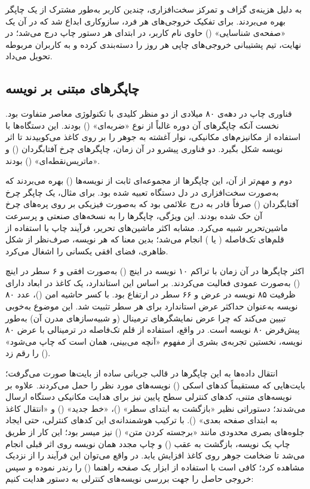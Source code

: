 به دلیل هزینه‌ی گزاف و تمرکز سخت‌افزاری، چندین کاربر به‌طور مشترک از یک چاپگر بهره می‌بردند. برای تفکیک خروجی‌های هر فرد، سازوکاری ابداع شد که در آن یک «صفحه‌ی شناسایی» () حاوی نام کاربر، در ابتدای هر دستور چاپ درج می‌شد؛ در نهایت، تیم پشتیبانی خروجی‌های چاپی هر روز را دسته‌بندی کرده و به کاربران مربوطه تحویل می‌داد.

\subsection{چاپگرهای مبتنی بر نویسه}

فناوری چاپ در دهه‌ی ۸۰ میلادی از دو منظر کلیدی با تکنولوژی معاصر متفاوت بود. نخست آنکه چاپگرهای آن دوره غالباً از نوع «ضربه‌ای» () بودند. این دستگاه‌ها با استفاده از مکانیزم‌های مکانیکی، نوار آغشته به جوهر را بر روی کاغذ می‌کوبیدند تا اثر نویسه شکل بگیرد. دو فناوری پیشرو در آن زمان، چاپگرهای چرخ آفتابگردان () و «ماتریس‌نقطه‌ای» () بودند.

دوم و مهم‌تر از آن، این چاپگرها از مجموعه‌ای ثابت از نویسه‌ها () بهره می‌بردند که به‌صورت سخت‌افزاری در دل دستگاه تعبیه شده بود. برای مثال، یک چاپگر چرخ آفتابگردان () صرفاً قادر به درج علائمی بود که به‌صورت فیزیکی بر روی پره‌های چرخ آن حک شده بودند. این ویژگی، چاپگرها را به نسخه‌های صنعتی و پرسرعت ماشین‌تحریر شبیه می‌کرد. مشابه اکثر ماشین‌های تحریر، فرآیند چاپ با استفاده از قلم‌های تک‌فاصله ( یا ) انجام می‌شد؛ بدین معنا که هر نویسه، صرف‌نظر از شکل ظاهری، فضای افقی یکسانی را اشغال می‌کرد.

اکثر چاپگرها در آن زمان با تراکم ۱۰ نویسه در اینچ () به‌صورت افقی و ۶ سطر در اینچ () به‌صورت عمودی فعالیت می‌کردند. بر اساس این استاندارد، یک کاغذ در ابعاد  دارای ظرفیت ۸۵ نویسه در عرض و ۶۶ سطر در ارتفاع بود. با کسر حاشیه امن ()، عدد ۸۰ نویسه به‌عنوان حداکثر عرض استاندارد برای هر سطر تثبیت شد. این موضوع به‌خوبی تبیین می‌کند که چرا عرض نمایشگرهای ترمینال (و شبیه‌سازهای مدرن آن) به‌طور پیش‌فرض ۸۰ نویسه است. در واقع، استفاده از قلم تک‌فاصله در ترمینالی با عرض ۸۰ نویسه، نخستین تجربه‌ی بشری از مفهوم «آنچه می‌بینی، همان است که چاپ می‌شود» () را رقم زد.

انتقال داده‌ها به این چاپگرها در قالب جریانی ساده از بایت‌ها صورت می‌گرفت؛ بایت‌هایی که مستقیماً کدهای اسکی () نویسه‌های مورد نظر را حمل می‌کردند. علاوه بر نویسه‌های متنی، کدهای کنترلی سطح پایین  نیز برای هدایت مکانیکی دستگاه ارسال می‌شدند؛ دستوراتی نظیر «بازگشت به ابتدای سطر» ()، «خط جدید» () و «انتقال کاغذ به ابتدای صفحه بعدی» (). با ترکیب هوشمندانه‌ی این کدهای کنترلی، حتی ایجاد جلوه‌های بصری محدودی مانند «برجسته کردن متن» () نیز میسر بود؛ این کار از طریق چاپ یک نویسه، بازگشت به عقب () و چاپ مجدد همان نویسه روی اثر قبلی انجام می‌شد تا ضخامت جوهر روی کاغذ افزایش یابد. در واقع می‌توان این فرآیند را از نزدیک مشاهده کرد؛ کافی است با استفاده از ابزار  یک صفحه راهنما () را رندر نموده و سپس خروجی حاصل را جهت بررسی نویسه‌های کنترلی به دستور  هدایت کنیم:

